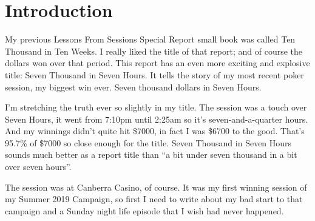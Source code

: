 \chapter{Introduction}


My previous Lessons From Sessions Special Report small book was
called Ten Thousand in Ten Weeks. I really liked the title of that
report; and of course the dollars won over that period.
This report has an even more exciting and explosive title: Seven
Thousand in Seven Hours. It tells the story of my most recent poker
session, my biggest win ever. Seven thousand dollars in Seven Hours.

I'm stretching the truth ever so slightly in my title. The session was
a touch over Seven Hours, it went from 7:10pm until 2:25am so it's
seven-and-a-quarter hours. And my winnings didn't quite hit \$7000, in
fact I was \$6700 to the good. That's 95.7\% of \$7000 so close enough
for the title. Seven Thousand in Seven Hours sounds much better as a
report title than ``a bit under seven thousand in a bit over seven
hours''.

The session was at Canberra Casino, of course. It was my first winning
session of my Summer 2019 Campaign, so first I need to write about my
bad start to that campaign and a Sunday night life episode that I
wish had never happened.







